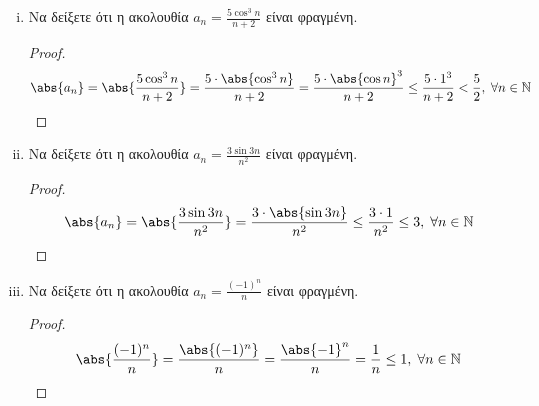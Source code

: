 \begin{enumerate}
\begin{enumerate}[i)]
                \begin{proof}
                    \begin{align*}
                        \abs{\frac{\cos{n} + n \sin{n}}{n^{2}}} = 
                        \frac{\abs{\cos{n} + n \sin{n}}}{n^{2}} \leq 
                        \frac{\abs{\cos{n}} + \abs{n \sin{n}}}{n^{2}} 
               &= \frac{\abs{\cos{n}} + n \abs{\sin{n}}}{n^{2}} \leq 
               \frac{1 + n\cdot 1}{n^{2}} = \\
               &= \frac{1}{n^{2}} + \frac{1}{n} \leq 
               1 + 1 = 2, \; \forall n \in \mathbb{N}
                    \end{align*} 
                \end{proof}

            \item Να δείξετε ότι η ακολουθία $ a_{n} = \frac{5 \cos^{3}{n}}{n+2} $ 
                είναι φραγμένη.

                \begin{proof}
                    \[
                        \abs{a_{n}} = \abs{\frac{5 \cos^{3}{n}}{n+2}} = 
                        \frac{5 \cdot \abs{\cos^{3}{n}}}{n+2} = \frac{5\cdot 
                        \abs{\cos{n}}^ {3}}{n+2} \leq  \frac{5 \cdot 1^{3}}{n+2} < 
                        \frac{5}{2}, \; \forall n \in \mathbb{N}
                    \]
                \end{proof}

            \item Να δείξετε ότι η ακολουθία $ a_{n} = \frac{3 \sin{3n}}{n^{2}} $ 
                είναι φραγμένη.

                \begin{proof}
                    \[
                        \abs{a_{n}} = \abs{\frac{3 \sin{3n}}{n^{2}}} = 
                        \frac{3 \cdot \abs{\sin{3n}}}{n^{2}} \leq 
                        \frac{3 \cdot 1}{n^{2}} \leq 3, \; \forall n \in \mathbb{N}  
                    \] 
                \end{proof}

            \item Να δείξετε ότι η ακολουθία $ a_{n} = \frac{(-1)^{n}}{n} $ είναι 
                φραγμένη.

                \begin{proof}
                    \[
                        \abs{\frac{(-1)^{n}}{n}} = \frac{\abs{(-1)^{n}}}{n} = 
                        \frac{\abs{-1}^{n}}{n} = \frac{1}{n} \leq 1, \; \forall n \in 
                        \mathbb{N} 
                    \] 
                \end{proof}


\end{enumerate}
\end{enumerate}
